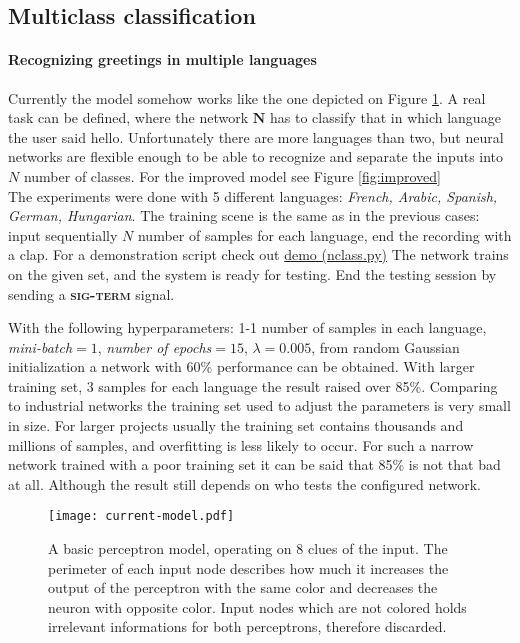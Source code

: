 \subsection{Multiclass classification}
\paragraph{Recognizing greetings in multiple languages}
Currently the model somehow works like the one depicted on Figure \ref{fig:dumb}. A real task can be defined, where the network $\mathbf{N}$ has to classify that in which language the user said hello. Unfortunately there are more languages than two, but neural networks are flexible enough to be able to recognize and separate the inputs into  $N$ number of classes. For the improved model see Figure \ref{fig:improved} \\

The experiments were done with 5 different languages: \emph{French, Arabic, Spanish, German, Hungarian}. The training scene is the same as in the previous cases: input sequentially $N$ number of samples for each language, end the recording with a clap.
For a demonstration script check out \href{https://github.com/botcs/deepvision/tree/master/demo/audio}{demo (nclass.py)}
The network trains on the given set, and the system is ready for testing. End the testing session by sending a \textbf{\textsc{sig-term}} signal. 

With the following hyperparameters: 1-1 number of samples in each language, \emph{mini-batch}$=1$, \emph{number of epochs}$=15$, $\lambda=0.005$, from random Gaussian initialization a network with 60\% performance can be obtained. 
With larger training set, 3 samples for each language the result raised over 85\%. Comparing to industrial networks the training set used to adjust the parameters is very small in size. 
For larger projects usually the training set contains thousands and millions of samples, and overfitting is less likely to occur. 
For such a narrow network trained with a poor training set it can be said that 85\% is not that bad at all. Although the result still depends on who tests the configured network.

\begin{figure}
	\centering
	\texttt{[image: current-model.pdf]}
	\caption{A basic perceptron model, operating on 8 clues of the input. The perimeter of each input node describes how much it increases the output of the perceptron with the same color and decreases the neuron with opposite color. Input nodes which are not colored holds irrelevant informations for both perceptrons, therefore discarded.}
	
	\label{fig:dumb}
\end{figure}

